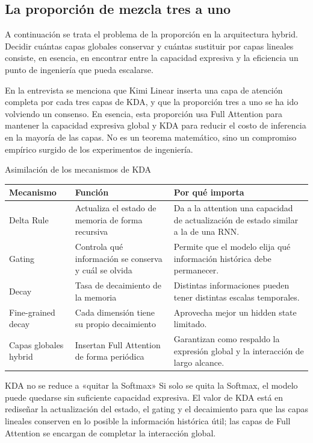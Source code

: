 \documentclass[a4paper]{article}
\begin{document}
\subsection{La proporción de mezcla tres a uno}

A continuación se trata el problema de la proporción en la arquitectura hybrid. Decidir cuántas capas globales conservar y cuántas sustituir por capas lineales consiste, en esencia, en encontrar entre la capacidad expresiva y la eficiencia un punto de ingeniería que pueda escalarse.

En la entrevista se menciona que Kimi Linear inserta una capa de atención completa por cada tres capas de KDA, y que la proporción tres a uno se ha ido volviendo un consenso. En esencia, esta proporción usa Full Attention para mantener la capacidad expresiva global y KDA para reducir el costo de inferencia en la mayoría de las capas. No es un teorema matemático, sino un compromiso empírico surgido de los experimentos de ingeniería.

\begin{knowledgebox}{Asimilación de los mecanismos de KDA}
\begin{tabularx}{\textwidth}{p{}p{}X}
\toprule
Mecanismo & Función & Por qué importa \\
\midrule
Delta Rule & Actualiza el estado de memoria de forma recursiva & Da a la attention una capacidad de actualización de estado similar a la de una RNN. \\
Gating & Controla qué información se conserva y cuál se olvida & Permite que el modelo elija qué información histórica debe permanecer. \\
Decay & Tasa de decaimiento de la memoria & Distintas informaciones pueden tener distintas escalas temporales. \\
Fine-grained decay & Cada dimensión tiene su propio decaimiento & Aprovecha mejor un hidden state limitado. \\
Capas globales hybrid & Insertan Full Attention de forma periódica & Garantizan como respaldo la expresión global y la interacción de largo alcance. \\
\bottomrule
\end{tabularx}
\end{knowledgebox}

\begin{warningbox}{KDA no se reduce a «quitar la Softmax»}
Si solo se quita la Softmax, el modelo puede quedarse sin suficiente capacidad expresiva. El valor de KDA está en rediseñar la actualización del estado, el gating y el decaimiento para que las capas lineales conserven en lo posible la información histórica útil; las capas de Full Attention se encargan de completar la interacción global.
\end{warningbox}
\end{document}

